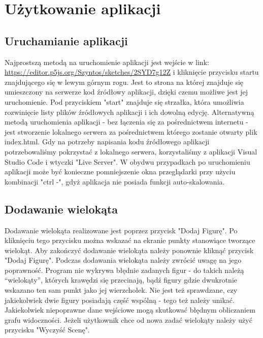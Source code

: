 \documentclass{article}
\begin{document}
\section{Użytkowanie aplikacji}
\subsection{Uruchamianie aplikacji}
\qquad Najprostszą metodą na uruchomienie aplikacji jest wejście w link: \url{https://editor.p5js.org/Szyntos/sketches/2SYD7g12Z} i kliknięcie przycisku startu znajdującego się w lewym górnym rogu. Jest to strona na której znajduje się umieszczony na serwerze kod źródłowy aplikacji, dzięki czemu możliwe jest jej uruchomienie. Pod przyciskiem "start" znajduje się strzałka, która umożliwia rozwinięcie listy plików źródłowych aplikacji i ich dowolną edycję. Alternatywną metodą uruchomienia aplikacji - bez łączenia się za pośrednictwem internetu - jest stworzenie lokalnego serwera za pośrednictwem którego zostanie otwarty plik index.html. Gdy na potrzeby napisania kodu źródłowego aplikacji potrzebowaliśmy pokrzystać z lokalnego serwera, korzystaliśmy z aplikacji Visual Studio Code i wtyczki "Live Server". W obydwu przypadkach po uruchomieniu aplikacji może być konieczne pomniejszenie okna przeglądarki przy użyciu kombinacji "ctrl -", gdyż aplikacja nie posiada funkcji auto-skalowania. 

\subsection{Dodawanie wielokąta}
\qquad Dodawanie wielokąta realizowane jest poprzez przycisk "Dodaj Figurę". Po kliknięciu tego przycisku można wskazać na ekranie punkty stanowiące tworzące wielokąt. Aby zakończyć dodawanie wielokąta należy ponownie kliknąć przycisk "Dodaj Figurę". Podczas dodawania wielokąta należy zwrócić uwagę na jego poprawność. Program nie wykrywa błędnie zadanych figur - do takich należą ``wielokąty'', których krawędzi się przecinają, bądź figury gdzie dwukrotnie wskazano ten sam punkt jako jej wierzchołek. Nie jest też sprawdzane, czy jakiekolwiek dwie figury posiadają część wspólną - tego też należy unikać. Jakiekolwiek niepoprawne dane wejściowe mogą skutkować błędnym obliczaniem grafu widoczności. Jeżeli użytkownik chce od nowa zadać wielokąty należy użyć przycisku "Wyczyść Scenę".
\end{document}
